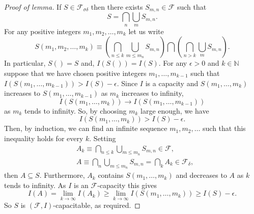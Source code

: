 \documentclass[12pt]{article}
\begin{document}
\begin{proof}[Proof of lemma]
If $S\in\mathcal{F}_{\sigma\delta}$ then there exists $S_{m,n}\in\mathcal{F}$ such that
\begin{equation*}
S =\bigcap_n\bigcup_mS_{m,n}.
\end{equation*}
For any positive integers $m_1,m_2,\ldots,m_k$ let us write
\begin{equation*}
S(m_1,m_2,\ldots,m_k)\equiv\left(\bigcap_{n\le k}\bigcup_{m\le m_n}S_{m,n}\right)\bigcap\left(\bigcap_{n>k}\bigcup_mS_{m,n}\right).
\end{equation*}
In particular, $S()=S$ and, $I(S())=I(S)$. For any $\epsilon>0$ and $k\in\mathbb{N}$ suppose that we have chosen positive integers $m_1,\dots,m_{k-1}$ such that $I(S(m_1,\ldots,m_{k-1}))>I(S)-\epsilon$. Since $I$ is a capacity and $S(m_1,\ldots,m_k)$ increases to $S(m_1,\ldots,m_{k-1})$ as $m_k$ increases to infinity,
\begin{equation*}
I(S(m_1,\ldots,m_{k}))\rightarrow I(S(m_1,\ldots,m_{k-1}))
\end{equation*}
as $m_k$ tends to infinity. So, by choosing $m_k$ large enough, we have
\begin{equation*}
I(S(m_1,\ldots,m_k))>I(S)-\epsilon.
\end{equation*}
Then, by induction, we can find an infinite sequence $m_1,m_2,\ldots$ such that this inequality holds for every $k$.
Setting
\begin{align*}
&A_k\equiv\bigcap_{n\le k}\bigcup_{m\le m_n}S_{m,n}\in\mathcal{F},\\
&A\equiv\bigcap_n\bigcup_{m\le m_n}S_{m,n}=\bigcap_kA_k\in\mathcal{F}_\delta,
\end{align*}
then $A\subseteq S$. Furthermore, $A_k$ contains $S(m_1,\ldots,m_k)$ and decreases to $A$ as $k$ tends to infinity.  As $I$ is an $\mathcal{F}$-capacity this gives
\begin{equation*}
I(A)=\lim_{k\rightarrow\infty}I(A_k)\ge\lim_{k\rightarrow\infty}I(S(m_1,\ldots,m_k))\ge I(S)-\epsilon.
\end{equation*}
So $S$ is $(\mathcal{F},I)$-capacitable, as required.
\end{proof}

\end{document}
